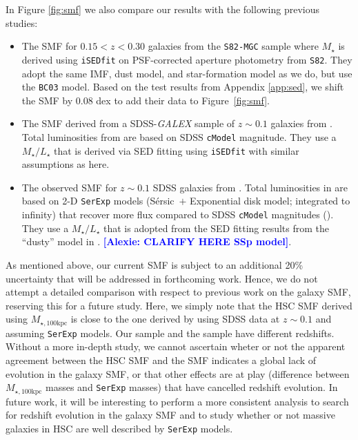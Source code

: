 \documentclass[a4paper,fleqn,usenatbib]{mnras}
\def\ser{{S\'{e}rsic\ }}
\def\cmodel{\texttt{cModel}}
\def\mstar{{$M_{\star}$}}
\def\mtot{{$M_{\star,100\mathrm{kpc}}$}}
\def\m2l{{$M_{\star}/L_{\star}$}}
\newcommand{\alexie}[1]{\textcolor{blue}{\textbf{[Alexie: #1]}}}
\begin{document}
    
    In Figure \ref{fig:smf} we also compare our results  with the following previous studies:

    \begin{itemize}

        \item The SMF for $0.15 < z < 0.30$ galaxies from the \texttt{S82-MGC} sample
            \citep{Leauthaud2016} where \mstar{} is derived using 
            \texttt{iSEDfit} on PSF-corrected aperture photometry from 
            \texttt{S82}. They adopt the same IMF, dust model, and star-formation model as we do, but use the \texttt{BC03} model. Based on the test results from Appendix \ref{app:sed}, we shift the \citet{Leauthaud2016} SMF by 0.08 dex to add their data to Figure~\ref{fig:smf}.      
        \item The SMF derived from a SDSS-\textit{GALEX} sample of $z{\sim} 0.1$ 
            galaxies from \citet{Moustakas13}.  Total luminosities from \citet{Moustakas13} are based on SDSS \cmodel{} magnitude. 
            They use a \m2l{} that is derived via SED fitting using \texttt{iSEDfit} with similar 
            assumptions as here.
        \item The observed SMF for $z{\sim} 0.1$ SDSS galaxies from 
            \citet{Bernardi2017}.  Total luminosities in  \citet{Bernardi2017} are based on 2-D \texttt{SerExp} models 
            (\ser{}$+$ Exponential disk model; integrated to infinity) that 
            recover more flux compared to SDSS \cmodel{} magnitudes 
            (\citealt{Bernardi2013, Meert2015}). 
            They use a  \m2l{} that is adopted from the SED fitting results from the ``dusty'' 
            model in \citet{Mendel2014}.  \alexie{CLARIFY HERE SSp model}.   
    \end{itemize}
    
    As mentioned above, our current SMF is subject to an additional 20\% uncertainty that will be addressed in forthcoming work. Hence,  we do not attempt a detailed comparison  with respect to previous work on the galaxy SMF, reserving this  for  a future study. Here, we simply note that the  HSC SMF derived using \mtot{} is close to the one derived by \citet{Bernardi2017} using SDSS data at $z{\sim}0.1$ and assuming \texttt{SerExp} models.  Our  sample and the \citet{Bernardi2017} sample have different redshifts. Without a more in-depth study, we cannot ascertain wheter or not  the apparent agreement between the HSC SMF and the  \citet{Bernardi2017} SMF indicates a global lack of evolution in the galaxy SMF, or  that other effects are at play (difference between \mtot{} masses and \texttt{SerExp} masses) that have cancelled redshift evolution.  In future work, it will be interesting to perform a more consistent analysis to search for redshift evolution in the galaxy SMF and to study whether  or not massive galaxies in HSC are well described by \texttt{SerExp} models.
    
\end{document}
